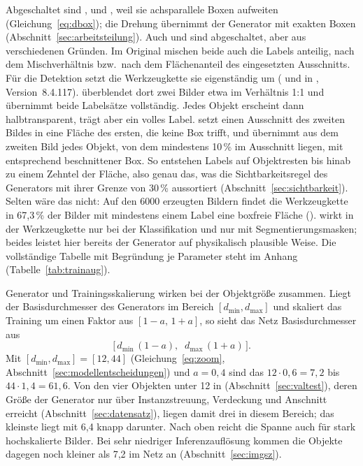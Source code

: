 Abgeschaltet sind ,  und , weil
sie achsparallele Boxen aufweiten (Gleichung~\eqref{eq:dbox}); die Drehung
übernimmt der Generator mit exakten Boxen (Abschnitt~\ref{sec:arbeitsteilung}).
Auch  \parencite{zhang2018mixup} und
 \parencite{yun2019cutmix} sind abgeschaltet, aber aus
verschiedenen Gründen. Im Original mischen beide auch die Labels anteilig, nach
dem Mischverhältnis bzw.\ nach dem Flächenanteil des eingesetzten Ausschnitts.
Für die Detektion setzt die Werkzeugkette sie eigenständig um ( und
 in , Version~8.4.117).
 überblendet dort zwei Bilder etwa im Verhältnis 1:1 und übernimmt
beide Labelsätze vollständig. Jedes Objekt erscheint dann halbtransparent,
trägt aber ein volles Label.  setzt einen Ausschnitt des zweiten
Bildes in eine Fläche des ersten, die keine Box trifft, und übernimmt aus dem
zweiten Bild jedes Objekt, von dem mindestens 10\,\% im Ausschnitt liegen, mit
entsprechend beschnittener Box. So entstehen Labels auf Objektresten bis hinab zu einem Zehntel der Fläche,
also genau das, was die Sichtbarkeitsregel des Generators mit ihrer Grenze von
30\,\% aussortiert (Abschnitt~\ref{sec:sichtbarkeit}). Selten wäre das nicht:
Auf den 6000 erzeugten Bildern findet die Werkzeugkette in 67,3\,\% der
Bilder mit mindestens einem Label eine boxfreie Fläche
().
 wirkt in der Werkzeugkette nur bei der Klassifikation und
 nur mit Segmentierungsmasken; beides leistet hier bereits
der Generator auf physikalisch plausible Weise. Die vollständige Tabelle mit Begründung je
Parameter steht im Anhang (Tabelle~\ref{tab:trainaug}).

Generator und Trainingsskalierung wirken bei der Objektgröße zusammen. Liegt
der Basisdurchmesser des Generators im Bereich $[d_{\min}, d_{\max}]$ und
skaliert das Training um einen Faktor aus $[1-a,\,1+a]$, so sieht das Netz
Basisdurchmesser aus
\begin{equation}
  \big[\,d_{\min}\,(1-a),\;\; d_{\max}\,(1+a)\,\big].
  \label{eq:effgroesse}
\end{equation}
Mit $[d_{\min}, d_{\max}] = [12, 44]$\px{} (Gleichung~\eqref{eq:zoom},
Abschnitt~\ref{sec:modellentscheidungen}) und $a = 0{,}4$ sind das
$12 \cdot 0{,}6 = 7{,}2$ bis $44 \cdot 1{,}4 = 61{,}6$\px. Von den vier
Objekten unter 12\px{} in  (Abschnitt~\ref{sec:valtest}), deren
Größe der Generator nur über Instanzstreuung, Verdeckung und Anschnitt erreicht
(Abschnitt~\ref{sec:datensatz}), liegen damit drei in diesem Bereich; das
kleinste liegt mit 6,4\px{} knapp darunter. Nach oben reicht
die Spanne auch für stark hochskalierte Bilder. Bei sehr niedriger
Inferenzauflösung kommen die Objekte dagegen noch kleiner als 7,2\px{} im Netz
an (Abschnitt~\ref{sec:imgsz}).

